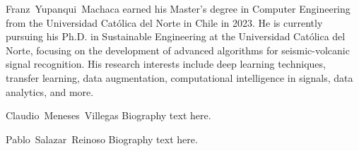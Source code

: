 \documentclass[journal]{IEEEtran}
\begin{document}
%
\begin{IEEEbiography}{Franz~Yupanqui~Machaca}
earned his Master's degree in Computer Engineering from the Universidad Católica del Norte in Chile in 2023. He is currently pursuing his Ph.D. in Sustainable Engineering at the Universidad Católica del Norte, focusing on the development of advanced algorithms for seismic-volcanic signal recognition. His research interests include deep learning techniques, transfer learning, data augmentation, computational intelligence in signals, data analytics, and more.
\end{IEEEbiography}

\begin{IEEEbiography}{Claudio~Meneses~Villegas}
Biography text here.
\end{IEEEbiography}

\begin{IEEEbiography}{Pablo~Salazar~Reinoso}
Biography text here.
\end{IEEEbiography}







\end{document}
